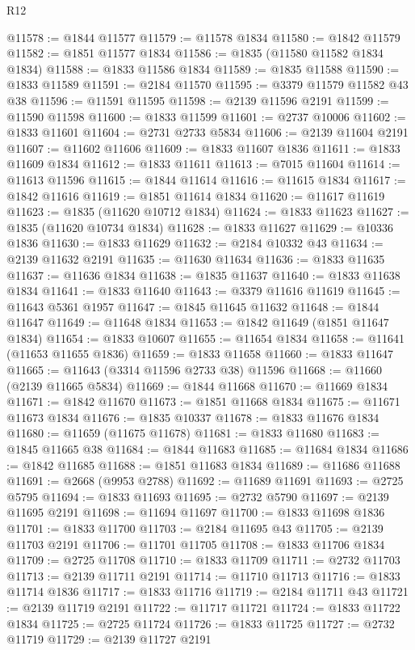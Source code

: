 \begin{lexlean}{R12}
\begin{coremodule}
@11578 := @1844 @11577
@11579 := @11578 @1834
@11580 := @1842 @11579
@11582 := @1851 @11577 @1834
@11586 := @1835 (@11580 @11582 @1834 @1834)
@11588 := @1833 @11586 @1834
@11589 := @1835 @11588
@11590 := @1833 @11589
@11591 := @2184 @11570
@11595 := @3379 @11579 @11582 @43 @38
@11596 := @11591 @11595
@11598 := @2139 @11596 @2191
@11599 := @11590 @11598
@11600 := @1833 @11599
@11601 := @2737 @10006
@11602 := @1833 @11601
@11604 := @2731 @2733 @5834
@11606 := @2139 @11604 @2191
@11607 := @11602 @11606
@11609 := @1833 @11607 @1836
@11611 := @1833 @11609 @1834
@11612 := @1833 @11611
@11613 := @7015 @11604
@11614 := @11613 @11596
@11615 := @1844 @11614
@11616 := @11615 @1834
@11617 := @1842 @11616
@11619 := @1851 @11614 @1834
@11620 := @11617 @11619
@11623 := @1835 (@11620 @10712 @1834)
@11624 := @1833 @11623
@11627 := @1835 (@11620 @10734 @1834)
@11628 := @1833 @11627
@11629 := @10336 @1836
@11630 := @1833 @11629
@11632 := @2184 @10332 @43
@11634 := @2139 @11632 @2191
@11635 := @11630 @11634
@11636 := @1833 @11635
@11637 := @11636 @1834
@11638 := @1835 @11637
@11640 := @1833 @11638 @1834
@11641 := @1833 @11640
@11643 := @3379 @11616 @11619
@11645 := @11643 @5361 @1957
@11647 := @1845 @11645 @11632
@11648 := @1844 @11647
@11649 := @11648 @1834
@11653 := @1842 @11649 (@1851 @11647 @1834)
@11654 := @1833 @10607
@11655 := @11654 @1834
@11658 := @11641 (@11653 @11655 @1836)
@11659 := @1833 @11658
@11660 := @1833 @11647
@11665 := @11643 (@3314 @11596 @2733 @38) @11596
@11668 := @11660 (@2139 @11665 @5834)
@11669 := @1844 @11668
@11670 := @11669 @1834
@11671 := @1842 @11670
@11673 := @1851 @11668 @1834
@11675 := @11671 @11673 @1834
@11676 := @1835 @10337
@11678 := @1833 @11676 @1834
@11680 := @11659 (@11675 @11678)
@11681 := @1833 @11680
@11683 := @1845 @11665 @38
@11684 := @1844 @11683
@11685 := @11684 @1834
@11686 := @1842 @11685
@11688 := @1851 @11683 @1834
@11689 := @11686 @11688
@11691 := @2668 (@9953 @2788)
@11692 := @11689 @11691
@11693 := @2725 @5795
@11694 := @1833 @11693
@11695 := @2732 @5790
@11697 := @2139 @11695 @2191
@11698 := @11694 @11697
@11700 := @1833 @11698 @1836
@11701 := @1833 @11700
@11703 := @2184 @11695 @43
@11705 := @2139 @11703 @2191
@11706 := @11701 @11705
@11708 := @1833 @11706 @1834
@11709 := @2725 @11708
@11710 := @1833 @11709
@11711 := @2732 @11703
@11713 := @2139 @11711 @2191
@11714 := @11710 @11713
@11716 := @1833 @11714 @1836
@11717 := @1833 @11716
@11719 := @2184 @11711 @43
@11721 := @2139 @11719 @2191
@11722 := @11717 @11721
@11724 := @1833 @11722 @1834
@11725 := @2725 @11724
@11726 := @1833 @11725
@11727 := @2732 @11719
@11729 := @2139 @11727 @2191

\end{coremodule}
\end{lexlean}
